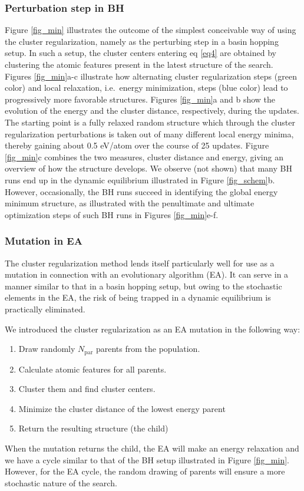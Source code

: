 \documentclass[aip,amsmath,amssymb,reprint]{revtex4-1}
\begin{document}
\subsubsection{Perturbation step in BH}
Figure \ref{fig_min} illustrates the outcome of the simplest
conceivable way of using the cluster regularization, namely as the
perturbing step in a basin hopping setup. In such a setup, the cluster
centers entering eq \ref{eq4} are obtained by clustering the
atomic features present in the latest structure of the search. Figures
\ref{fig_min}a-c illustrate how alternating cluster regularization
steps (green color) and local relaxation, i.e.\ energy minimization,
steps (blue color) lead to progressively more favorable
structures. Figures \ref{fig_min}a and b show the evolution of the
energy and the cluster distance, respectively, during the updates. The
starting point is a fully relaxed random structure which through the
cluster regularization perturbations is taken out of many different
local energy minima, thereby gaining about 0.5 eV/atom over the course of
25 updates. Figure \ref{fig_min}c combines the two measures, cluster
distance and energy, giving an overview of how the structure
develops. We observe (not shown) that many BH runs end up in the dynamic
equilibrium illustrated in Figure \ref{fig_schem}b. However, occasionally, the BH runs succeed in
identifying the global energy minimum structure, as illustrated with
the penultimate and ultimate optimization steps of such BH runs in
Figures \ref{fig_min}e-f.

\subsubsection{Mutation in EA}
The cluster regularization method lends itself particularly well for
use as a mutation in connection with an evolutionary algorithm (EA). It can
serve in a manner similar to that in a basin hopping setup, but owing
to the stochastic elements in the EA, the risk of being trapped in a
dynamic equilibrium is practically eliminated.

We introduced the cluster regularization as an EA mutation in the following way:
\begin{enumerate}
\item Draw randomly $N_\mathrm{par}$ parents from the population.
\item Calculate atomic features for all parents.
\item Cluster them and find cluster centers.
\item Minimize the cluster distance of the lowest energy parent
\item Return the resulting structure (the child)
\end{enumerate}
When the mutation returns the child, the EA will make an energy
relaxation and we have a cycle similar to that of the BH setup
illustrated in Figure \ref{fig_min}. However, for the EA cycle, the
random drawing of parents will ensure a more stochastic nature of the
search.
\end{document}
